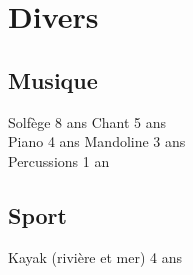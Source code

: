 \section{Divers}
\sectionsep

\subsection{Musique}

Solfège {\footnotesize 8 ans} \textbullet{} Chant {\footnotesize 5 ans} \\ 
Piano {\footnotesize 4 ans} \textbullet{} Mandoline {\footnotesize 3 ans}  \\
Percussions {\footnotesize 1 an}

\subsection{Sport}
Kayak (rivière et mer) {\footnotesize4 ans}